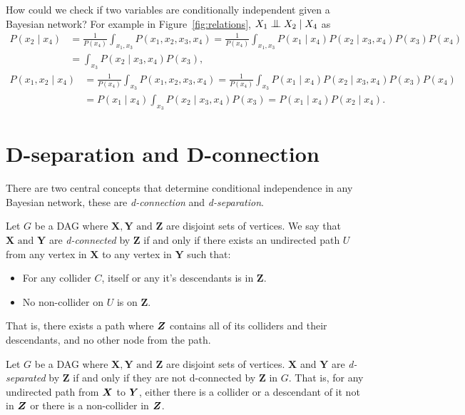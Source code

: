 How could we check if two variables are conditionally independent given a
Bayesian network? For example in Figure~\ref{fig:relations}, \(X_1 \bigCI
X_2 \mid X_4\) as
\[
  \begin{aligned}
    P(x_2 \mid x_4) &= \frac{1}{P(x_4)}\int_{x_1,x_3}P(x_1, x_2, x_3, x_4)
    = \frac{1}{P(x_4)}\int_{x_1,x_3}P(x_1 \mid x_4)P(x_2\mid x_3,x_4)P(x_3)P(x_4)\\
    &= \int_{x_3}P(x_2\mid x_3, x_4)P(x_3),
  \end{aligned}
\]
\[
  \begin{aligned}
    P(x_1, x_2 \mid x_4) &= \frac{1}{P(x_4)}\int_{x_3}P(x_1, x_2, x_3, x_4)
    = \frac{1}{P(x_4)}\int_{x_3}P(x_1\mid x_4)P(x_2\mid x_3,x_4)P(x_3)P(x_4)\\
    &= P(x_1\mid x_4)\int_{x_3}P(x_2\mid x_3, x_4)P(x_3) = P(x_1\mid x_4)P(x_2\mid x_4).
  \end{aligned}
\]

\section{D-separation and D-connection}

There are two central concepts that determine conditional independence in any Bayesian network, these are \emph{d-connection} and \emph{d-separation}.

\begin{definition}
  Let \(G\) be a DAG where \(\bm{X}, \bm{Y} \text{ and } \bm{Z}\)
  are disjoint sets of vertices. We say that \(\bm{X} \text{ and
  } \bm{Y}\) are \emph{d-connected} by \(\bm{Z}\) if and only if there
  exists an undirected path \(U\) from any vertex in \(\bm{X}\) to any
  vertex in \(\bm{Y}\) such that:
  \begin{itemize}
    \item For any  collider \(C\), itself or any it's descendants is in \(\bm{Z}\).
    \item No non-collider on \(U\) is on \(\bm{Z}\).
  \end{itemize}
  That is, there exists a path where \(\bm{Z}\) contains all of its colliders and their descendants, and no other node from the path.
\end{definition}

\begin{definition}
  Let \(G\) be a DAG where \(\bm{X}, \bm{Y} \text{ and } \bm{Z}\) are disjoint sets of vertices. \(\bm{X}\) and \(\bm{Y}\) are \emph{d-separated} by \(\bm{Z}\) if and only if they are not d-connected by \(\bm{Z}\) in \(G\). That is, for any undirected path from \(\bm{X}\) to \(\bm{Y}\), either there is a collider or a descendant of it not in \(\bm{Z}\) or there is a non-collider in  \(\bm{Z}\).
\end{definition}

